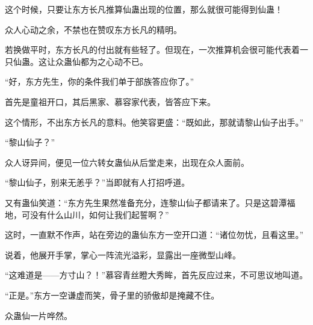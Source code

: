\begin{this_body}
这个时候，只要让东方长凡推算仙蛊出现的位置，那么就很可能得到仙蛊！

众人心动之余，不禁也在赞叹东方长凡的精明。

若换做平时，东方长凡的付出就有些轻了。但现在，一次推算机会很可能代表着一只仙蛊。这让众蛊仙都为之心动不已。

“好，东方先生，你的条件我们单于部族答应你了。”

首先是童祖开口，其后黑家、慕容家代表，皆答应下来。

这个情形，不出东方长凡的意料。他笑容更盛：“既如此，那就请黎山仙子出手。”

“黎山仙子？”

众人讶异间，便见一位六转女蛊仙从后堂走来，出现在众人面前。

“黎山仙子，别来无恙乎？”当即就有人打招呼道。

又有蛊仙笑道：“东方先生果然准备充分，连黎山仙子都请来了。只是这碧潭福地，可没有什么山川，如何让我们起誓啊？”

这时，一直默不作声，站在旁边的蛊仙东方一空开口道：“诸位勿忧，且看这里。”

说着，他展开手掌，掌心一阵流光溢彩，显露出一座微型山峰。

“这难道是——方寸山？！”慕容青丝瞪大秀眸，首先反应过来，不可思议地叫道。

“正是。”东方一空谦虚而笑，骨子里的骄傲却是掩藏不住。

众蛊仙一片哗然。

\end{this_body}


